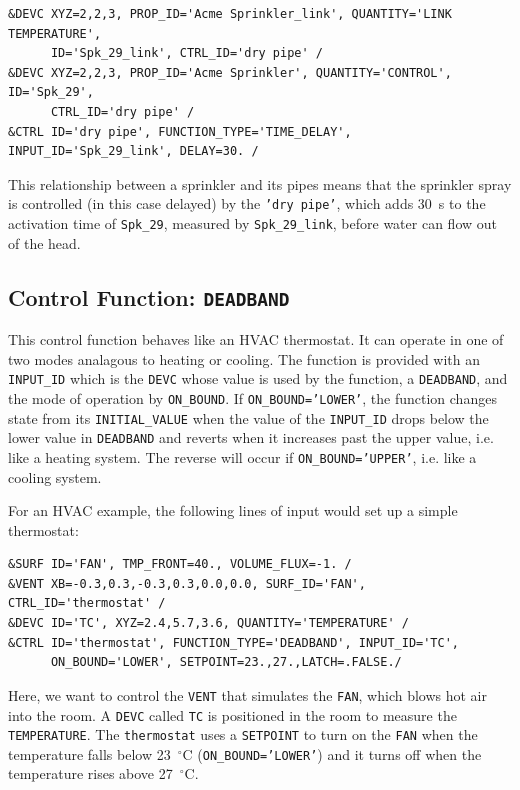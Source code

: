 \documentclass[11pt]{book}
\newcommand{\ct}{\tt\small}
\begin{document}
\footnotesize
\begin{verbatim}
&DEVC XYZ=2,2,3, PROP_ID='Acme Sprinkler_link', QUANTITY='LINK TEMPERATURE',
      ID='Spk_29_link', CTRL_ID='dry pipe' /
&DEVC XYZ=2,2,3, PROP_ID='Acme Sprinkler', QUANTITY='CONTROL', ID='Spk_29',
      CTRL_ID='dry pipe' /
&CTRL ID='dry pipe', FUNCTION_TYPE='TIME_DELAY', INPUT_ID='Spk_29_link', DELAY=30. /
\end{verbatim}
\normalsize

\noindent
This relationship between a sprinkler and its pipes means that the sprinkler spray is controlled (in this case delayed) by the
{\ct 'dry pipe'}, which adds 30~s to the activation time of {\ct Spk\_29}, measured by  {\ct Spk\_29\_link},
before water can flow out of the head.


\subsection{Control Function: \texorpdfstring{{\tt DEADBAND}}{DEADBAND}}
\label{info:DEADBAND}

This control function behaves like an HVAC thermostat.  It can operate in one of two modes analagous to heating or cooling.
The function is provided with an {\ct INPUT\_ID} which is the {\ct DEVC} whose value is used by the function,
a {\ct DEADBAND}, and the mode of operation by {\ct ON\_BOUND}.  If  {\ct ON\_BOUND='LOWER'},
the function changes state from its {\ct INITIAL\_VALUE} when the value of the {\ct INPUT\_ID} drops
below the lower value in {\ct DEADBAND} and reverts when it increases past the upper value, i.e. like a heating system.
The reverse will occur if {\ct ON\_BOUND='UPPER'}, i.e. like a cooling system.

For an HVAC example, the following lines of input would set up a simple thermostat:

\footnotesize
\begin{verbatim}
&SURF ID='FAN', TMP_FRONT=40., VOLUME_FLUX=-1. /
&VENT XB=-0.3,0.3,-0.3,0.3,0.0,0.0, SURF_ID='FAN', CTRL_ID='thermostat' /
&DEVC ID='TC', XYZ=2.4,5.7,3.6, QUANTITY='TEMPERATURE' /
&CTRL ID='thermostat', FUNCTION_TYPE='DEADBAND', INPUT_ID='TC',
      ON_BOUND='LOWER', SETPOINT=23.,27.,LATCH=.FALSE./
\end{verbatim} \normalsize

\noindent
Here, we want to control the {\ct VENT} that simulates the {\ct FAN}, which blows hot air
into the room. A {\ct DEVC} called {\ct TC} is positioned in the room to measure the {\ct TEMPERATURE}.
The {\ct thermostat} uses a {\ct SETPOINT} to turn on the
{\ct FAN} when the temperature falls below 23~$^\circ$C ({\ct ON\_BOUND='LOWER'})
and it turns off when the temperature rises above 27~$^\circ$C.
\end{document}
